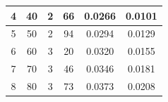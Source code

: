 \documentclass{article}
\begin{document}
\begin{table}[h!]
\begin{tabular}{cccccc}
4      & 40                                                           & 2                                                                              & 66                                                                           & 0.0266                                            & 0.0101                                              \\ \hline
5      & 50                                                           & 2                                                                              & 94                                                                            & 0.0294                                            & 0.0129                                              \\ \hline
6      & 60                                                           & 3                                                                              & 20                                                                           & 0.0320                                            & 0.0155                                              \\ \hline
7      & 70                                                           & 3                                                                              & 46                                                                           & 0.0346                                            & 0.0181                                              \\ \hline
8      & 80                                                           & 3                                                                              & 73                                                                           & 0.0373                                            & 0.0208                                              \\ \hline
\end{tabular}
\label{Tab:Na}
\end{table}
\end{document}

